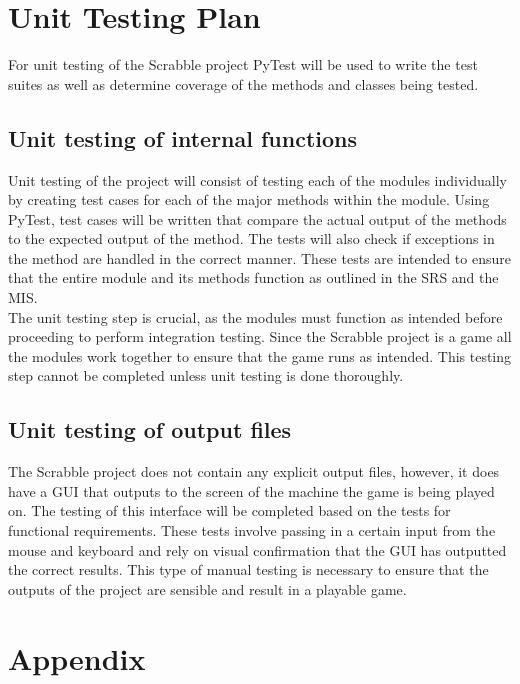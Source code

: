 \documentclass[12pt, titlepage]{article}
\begin{document}
\section{Unit Testing Plan}%
For unit testing of the Scrabble project PyTest will be used to write the test suites as well as determine coverage of the methods and classes being tested. 
\subsection{Unit testing of internal functions}
Unit testing of the project will consist of testing each of the modules individually by creating test cases for each of the major methods within the module. Using PyTest, test cases will be written that  compare the actual output of the methods to the expected output of the method. The tests will also check if exceptions in the method are handled in the correct manner. These tests are intended to ensure that the entire module and its methods function as outlined in the SRS and the MIS.\\
The unit testing step is crucial, as the modules must function as intended before proceeding to perform integration testing. Since the Scrabble project is a game all the modules work together to ensure that the game runs as intended. This testing step cannot be completed unless unit testing is done thoroughly.
		
\subsection{Unit testing of output files}	
The Scrabble project does not contain any explicit output files, however, it does have a GUI that outputs to the screen of the machine the game is being played on. The testing of this interface will be completed based on the tests for functional requirements. These tests involve passing in a certain input from the mouse and keyboard and rely on visual confirmation that the GUI has outputted the correct results. This type of manual testing is necessary to ensure that the outputs of the project are sensible and result in a playable game.






\newpage

\section{Appendix}
\end{document}
